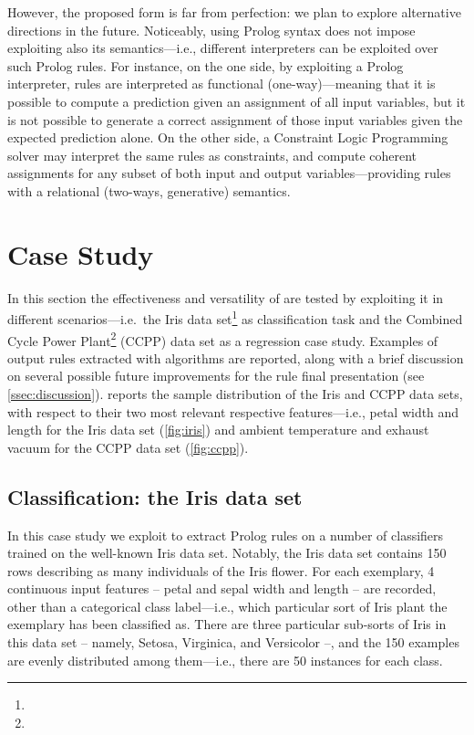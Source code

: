 \documentclass[12pt,a4paper,openright,twoside]{book}
\begin{document}
However, the proposed form is far from perfection: we plan to explore alternative directions in the future.
%
Noticeably, using Prolog syntax does not impose exploiting also its semantics---i.e., different interpreters can be exploited over such Prolog rules.
%
For instance, on the one side, by exploiting a Prolog interpreter, rules are interpreted as functional (one-way)---meaning that it is possible to compute a prediction given an assignment of all input variables, but it is not possible to generate a correct assignment of those input variables given the expected prediction alone.
%
On the other side, a Constraint Logic Programming solver \cite{GavanelliR10,JaffarM94} may interpret the same rules as constraints, and compute coherent assignments for any subset of both input and output variables---providing rules with a relational (two-ways, generative) semantics.

\section{Case Study}\label{sec:experiments}

In this section the effectiveness and versatility of \psyke{} are tested by exploiting it in different scenarios---i.e.\ the Iris data set\footnote{} as classification task and the Combined Cycle Power Plant\footnote{} (CCPP) data set as a regression case study.
%
Examples of output rules extracted with \psyke{} algorithms are reported, along with a brief discussion on several possible future improvements for the rule final presentation (see \cref{ssec:discussion}).
%
 reports the sample distribution of the Iris and CCPP data sets, with respect to their two most relevant respective features---i.e., petal width and length for the Iris data set (\cref{fig:iris}) and ambient temperature and exhaust vacuum for the CCPP data set (\cref{fig:ccpp}).
%


\subsection{Classification: the Iris data set}
%
In this case study we exploit \psyke{} to extract Prolog rules on a number of classifiers trained on the well-known Iris data set.
%
Notably, the Iris data set contains 150 rows describing as many individuals of the Iris flower.
%
For each exemplary, 4 continuous input features -- petal and sepal width and length -- are recorded, other than a categorical class label---i.e., which particular sort of Iris plant the exemplary has been classified as.
%
There are three particular sub-sorts of Iris in this data set -- namely, Setosa, Virginica, and Versicolor --, and the 150 examples are evenly distributed among them---i.e., there are 50 instances for each class.
\end{document}
